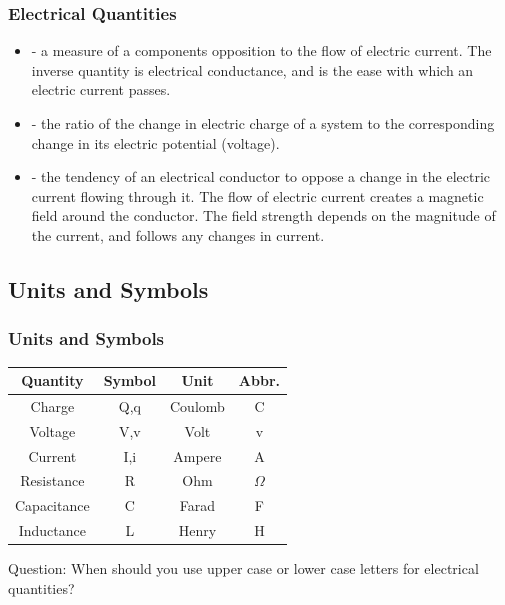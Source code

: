 \documentclass[fleqn]{beamer} %
\newcommand{\sectionIsubsectionIItitle}{Electrical Quantities}
\newcommand{\sectionIsubsectionIIItitle}{Units and Symbols}
\begin{document}
			\begin{frame}
				\frametitle{\sectionIsubsectionIItitle}
				
				\begin{itemize}

					\item {\BL \BL\underline{\hspace{30mm}}} - a measure of a components opposition to the flow of electric current. The inverse quantity is electrical conductance, and is the ease with which an electric current passes.  
							
					\item {\PR \BL\underline{\hspace{30mm}}} - the ratio of the change in electric charge of a system to the corresponding change in its electric potential (voltage).
					
					\item {\RD \BL\underline{\hspace{30mm}}} - the tendency of an electrical conductor to oppose a change in the electric current flowing through it. The flow of electric current creates a magnetic field around the conductor. The field strength depends on the magnitude of the current, and follows any changes in current.

				\end{itemize}

			\end{frame}


		\subsection{\sectionIsubsectionIIItitle}\label{sectionIsubsectionIII}
			\begin{frame} 
				\frametitle{\sectionIsubsectionIIItitle}

				\renewcommand{\arraystretch}{1.2}
				\begin{tabular}{|c|c|c|c|} \hline
					Quantity & Symbol & Unit & Abbr. \\ \hline\hline
				    Charge & Q,q & Coulomb & C \\ \hline
				    Voltage & V,v & Volt & v\\ \hline
				    Current & I,i & Ampere & A \\ \hline
				    Resistance & R & Ohm & $\Omega$ \\ \hline
				    Capacitance & C & Farad & F \\ \hline
				    Inductance & L & Henry & H  \\ \hline
				\end{tabular}
				
				\vspace*{10mm} Question: When should you use upper case or lower case letters for electrical quantities?
				
			\end{frame}	
\end{document}
